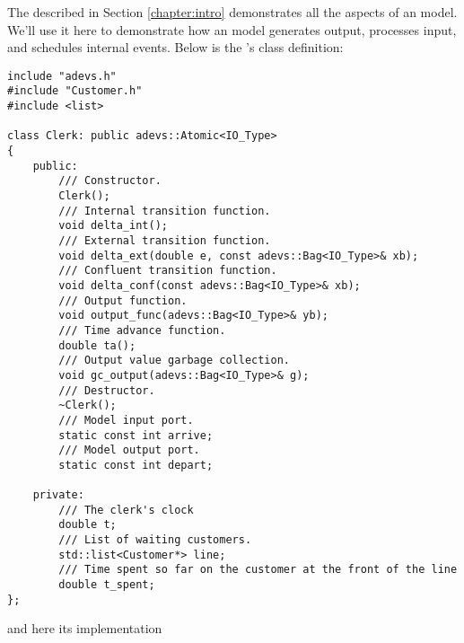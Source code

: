 The  described in Section \ref{chapter:intro} demonstrates all the aspects of an  model. We'll use it here to demonstrate how an  model generates output, processes input, and schedules internal events. Below is the 's class definition:
\begin{verbatim}
include "adevs.h"
#include "Customer.h"
#include <list>

class Clerk: public adevs::Atomic<IO_Type> 
{
    public:
        /// Constructor.
        Clerk();
        /// Internal transition function.
        void delta_int();
        /// External transition function.
        void delta_ext(double e, const adevs::Bag<IO_Type>& xb);
        /// Confluent transition function.
        void delta_conf(const adevs::Bag<IO_Type>& xb);
        /// Output function.  
        void output_func(adevs::Bag<IO_Type>& yb);
        /// Time advance function.
        double ta();
        /// Output value garbage collection.
        void gc_output(adevs::Bag<IO_Type>& g);
        /// Destructor.
        ~Clerk();
        /// Model input port.
        static const int arrive;
        /// Model output port.
        static const int depart;

    private:
        /// The clerk's clock
        double t;
        /// List of waiting customers.
        std::list<Customer*> line;
        /// Time spent so far on the customer at the front of the line
        double t_spent;
};
\end{verbatim}
and here its implementation
